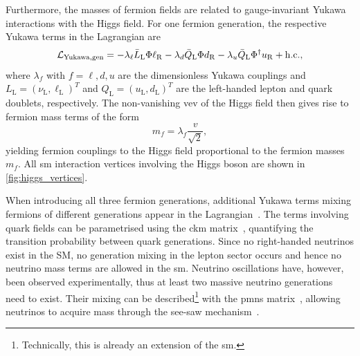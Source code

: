 Furthermore, the masses of fermion fields are related to gauge-invariant Yukawa interactions with the Higgs field. For one fermion generation, the respective Yukawa terms in the Lagrangian are
\begin{equation}
	\mathcal{L}_\mathrm{Yukawa,gen} = - \lambda_\ell \bar{L}_\mathrm{L}\Phi\ell_\mathrm{R} - \lambda_d \bar{Q}_\mathrm{L}\Phi d_\mathrm{R} - \lambda_u \bar{Q}_\mathrm{L} \Phi^\dagger u_\mathrm{R} + \mathrm{h.c.},
\end{equation}
where $\lambda_f$ with $f = \ell,d,u$ are the dimensionless Yukawa couplings and $L_\mathrm{L} = (\nu_\mathrm{L},\ell_\mathrm{L})^T$ and $Q_\mathrm{L} = (u_\mathrm{L},d_\mathrm{L})^T$ are the left-handed lepton and quark doublets, respectively. The non-vanishing \gls{vev} of the Higgs field then gives rise to fermion mass terms of the form 
\begin{equation}
 m_f = \lambda_f \frac{v}{\sqrt{2}},
\end{equation}
yielding fermion couplings to the Higgs field proportional to the fermion masses $m_f$. All \gls{sm} interaction vertices involving the Higgs boson are shown in \cref{fig:higgs_vertices}.

When introducing all three fermion generations, additional Yukawa terms mixing fermions of different generations appear in the Lagrangian~\cite{Brock:1354959}. The terms involving quark fields can be parametrised using the \gls{ckm} matrix~\cite{PhysRevLett.10.531,CKM:1973fv}, quantifying the transition probability between quark generations. Since no right-handed neutrinos exist in the SM, no generation mixing in the lepton sector occurs and hence no neutrino mass terms are allowed in the \gls{sm}. Neutrino oscillations have, however, been observed experimentally, thus at least two massive neutrino generations need to exist. Their mixing can be described\footnote{Technically, this is already an extension of the \gls{sm}.} with the \gls{pmns} matrix~\cite{PMNS:1962mu}, allowing neutrinos to acquire mass \eg through the see-saw mechanism~\cite{Brdar:2019iem}.
 
